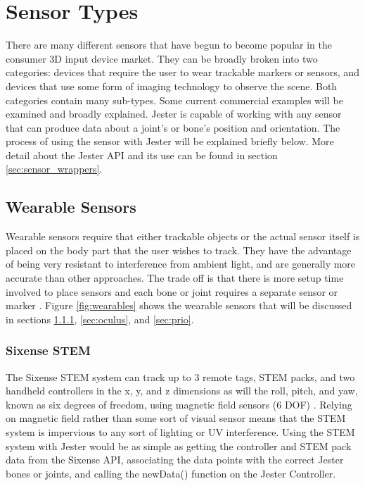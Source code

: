 \section{Sensor Types}

There are many different sensors that have begun to become popular in the consumer 3D input device market. They can be broadly broken into two categories: devices that require the user to wear trackable markers or sensors, and devices that use some form of imaging technology to observe the scene. Both categories contain many sub-types. Some current commercial examples will be examined and broadly explained. Jester is capable of working with any sensor that can produce data about a joint’s or bone’s position and orientation. The process of using the sensor with Jester will be explained briefly below. More detail about the Jester API and its use can be found in section \ref{sec:sensor_wrappers}. 

\subsection{Wearable Sensors}

Wearable sensors require that either trackable objects or the actual sensor itself is placed on the body part that the user wishes to track. They have the advantage of being very resistant to interference from ambient light, and are generally more accurate than other approaches. The trade off is that there is more setup time involved to place sensors and each bone or joint requires a separate sensor or marker \cite{zhu2004real}. Figure \ref{fig:wearables} shows the wearable sensors that will be discussed in sections \ref{sec:sixense}, \ref{sec:oculus}, and \ref{sec:prio}. 

\subsubsection{Sixense STEM}\label{sec:sixense}

The Sixense STEM system can track up to 3 remote tags, STEM packs, and two handheld controllers in the x, y, and z dimensions as will the roll, pitch, and yaw, known as six degrees of freedom, using magnetic field sensors (6 DOF) \cite{sixense_stem}. Relying on magnetic field rather than some sort of visual sensor means that the STEM system is impervious to any sort of lighting or UV interference. Using the STEM system with Jester would be as simple as getting the controller and STEM pack data from the Sixense API, associating the data points with the correct Jester bones or joints, and calling the newData() function on the Jester Controller.

